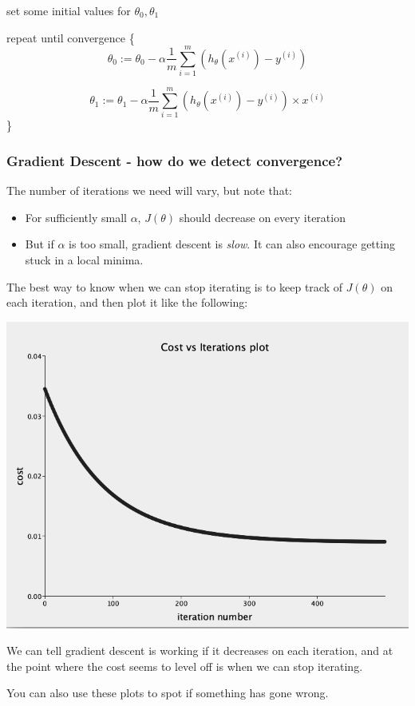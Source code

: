 \documentclass[12pt]{article}
\begin{document}
set some initial values for $\theta_0, \theta_1$

repeat until convergence \{
\[\theta_0 := \theta_0 - \alpha \frac{1}{m} \sum^m_{i=1} (h_\theta(x^{(i)}) - y^{(i)} )\]

\[\theta_1 := \theta_1 - \alpha \frac{1}{m} \sum^m_{i=1} (h_\theta(x^{(i)}) - y^{(i)}) \times x^{(i)}\]
\}

\subsubsection{Gradient Descent - how do we detect convergence?}

The number of iterations we need will vary, but note that:
\begin{itemize}
\item For sufficiently small $\alpha$, $J(\theta)$ should decrease on every iteration
\item But if $\alpha$ is too small, gradient descent is \textit{slow}. It can also encourage getting stuck in a local minima. 
\end{itemize}

The best way to know when we can stop iterating is to keep track of $J(\theta)$ on each iteration, and then plot it like the following:

\includegraphics[width={\textwidth}]{cost-iterations}

We can tell gradient descent is working if it decreases on each iteration, and at the point where the cost seems to level off is when we can stop iterating. 

You can also use these plots to spot if something has gone wrong. 
\end{document}
